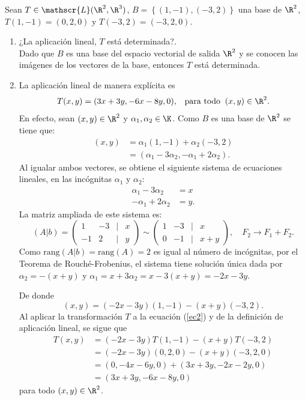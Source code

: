 \documentclass[compacto,10pt]{pubciencias-notas}
\begin{document}
\begin{ejem}
    Sean $T \in \mathscr{L}(\R^{2}, \R^{3})$, $B=\left\{(1, -1), (-3, 2) \right\}$ una base de $\R^2$, $T(1, -1)=(0, 2, 0)$ y $T(-3, 2) = (-3, 2, 0)$.
\begin{enumerate}
    \item ¿La aplicación lineal, $T$ está determinada?.\\
    Dado que $B$ es una base del espacio vectorial de salida $\R^2$ y se conocen las imágenes de los vectores de la base, entonces $T$ está determinada. 
    \item La aplicación lineal de manera explícita es
    \[
        T(x, y) = (3x+3y, -6x-8y, 0), \;\;\; \text{para todo}\;\; (x, y) \in \R^{2}.
    \]
En efecto, sean $(x,y)\in\R^2$ y $\alpha_1,\alpha_2\in\K$. Como $B$ es una base de $\R^2$ se tiene que:
\begin{align*}
(x,y) &= \alpha_1(1,-1)+\alpha_2(-3,2)\\
      &= (\alpha_1-3\alpha_2,-\alpha_1+2\alpha_2).
\end{align*}
Al igualar ambos vectores, se obtiene el siguiente sistema de ecuaciones lineales, en las incógnitas $\alpha_1$ y $\alpha_2$:
\begin{align*}
\alpha_1-3\alpha_2 &= x \\
-\alpha_1+2\alpha_2 &= y.
\end{align*}
La matriz ampliada de este sistema es:
\[(A|b)=\begin{pmatrix}1&-3&|&x\\-1&2&|&y\end{pmatrix}\sim\begin{pmatrix}1&-3&|&x\\0&-1&|&x+y\end{pmatrix}, \quad F_2\to F_1+F_2.\]
Como $\text{rang}(A|b)=\text{rang}(A)=2$ es igual al número de incógnitas, por el Teorema de Rouché-Frobenius, el sistema tiene solución única dada por $\alpha_2=-(x+y)$ y $\alpha_1=x+3\alpha_2=x-3(x+y)=-2x-3y$.

De donde
\begin{equation}
(x,y) = (-2x-3y)(1,-1)-(x+y)(-3,2). \label{ec2}
\end{equation}
Al aplicar la transformación $T$ a la ecuación (\ref{ec2}) y de la definición de aplicación lineal, se sigue que
\begin{align*}
T(x,y) &= (-2x-3y)T(1,-1)-(x+y)T(-3,2)\\
       &= (-2x-3y)(0,2,0)-(x+y)(-3,2,0)\\
       &= (0,-4x-6y,0)+(3x+3y,-2x-2y,0)\\
       &= (3x+3y,-6x-8y,0)
\end{align*}
para todo $(x, y) \in \R^{2}$.
\end{enumerate}
\end{ejem}
\end{document}
